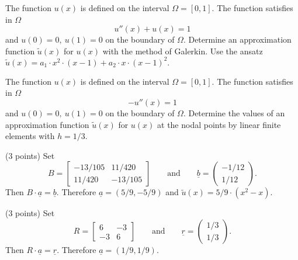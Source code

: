 \begin{teilaufgaben}
\item
The function $u(x)$ is defined on the interval $\Omega = [0, 1].$
The function satisfies in $\Omega$ 
\[
u''(x) + u(x) = 1
\]
and $u(0) = 0, \  u(1) = 0$ on the boundary of $\Omega$.  
Determine an approximation function $\tilde u(x)$ for $u(x)$ with the method of Galerkin.
Use the ansatz $\tilde u(x) = a_1 \cdot x^2 \cdot (x-1) + a_2 \cdot x \cdot (x-1)^2.$
\item
The function $u(x)$ is defined on the interval $\Omega = [0, 1].$
The function satisfies in $\Omega$ 
\[
- u''(x) = 1
\]
and $u(0) = 0, \  u(1) = 0$ on the boundary of $\Omega$.  
Determine the values of an approximation function $\tilde u(x)$ for $u(x)$ at the
nodal points by linear finite elements with $h = 1/3$.
\end{teilaufgaben}

\begin{loesung}
\begin{teilaufgaben}
\item
(3 points) Set
\[
B
=
\left[\begin{array}{rr} -13/105 & 11/420  \\ 11/420 & -13/105  \end{array}\right]
\qquad\text{and}\qquad
\underline{b}
=
\left(\begin{array}{r} -1/12 \\ 1/12 \end{array}\right).
\]
Then $B \cdot \underline{a} = \underline{b}$.
Therefore $\underline{a} = (5/9,-5/9)$ and $\tilde u(x) = 5/9 \cdot (x^2 - x)$.

\item
(3 points) Set
\[
R
=
\left[\begin{array}{rr} 6 & -3  \\ -3 & 6  \end{array}\right]
\qquad\text{and}\qquad
\underline{r}
=
\left(\begin{array}{r} 1/3 \\ 1/3 \end{array}\right).
\]
Then $R \cdot \underline{a} = \underline{r}$.
Therefore $\underline{a} = (1/9,1/9)$.
\qedhere
\end{teilaufgaben}
\end{loesung}


